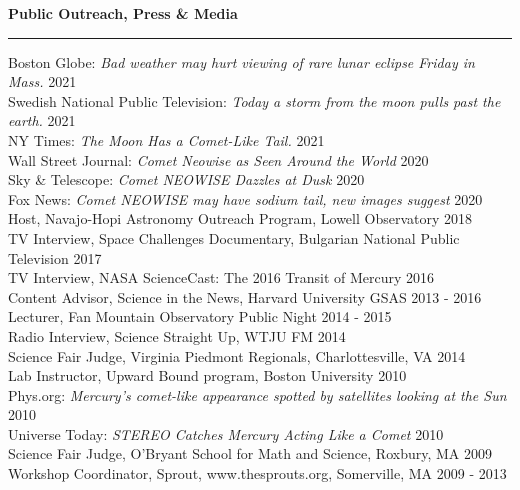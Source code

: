 \documentclass[12pt]{report}
\begin{document}
\noindent\bf{Public Outreach, Press \& Media}\rm \hspace*{\fill} \\
\rule{\textwidth}{1pt}
\noindent Boston Globe: {\it Bad weather may hurt viewing of rare lunar eclipse Friday in Mass.} \hfill 2021\\
\noindent Swedish National Public Television: {\it Today a storm from the moon pulls past the earth.} \hfill 2021\\
\noindent NY Times: {\it The Moon Has a Comet-Like Tail.} \hfill 2021\\
\noindent Wall Street Journal: {\it Comet Neowise as Seen Around the World} \hfill 2020\\
\noindent Sky \& Telescope: {\it Comet NEOWISE Dazzles at Dusk} \hfill 2020\\
\noindent Fox News: {\it Comet NEOWISE may have sodium tail, new images suggest} \hfill 2020\\
\noindent Host, Navajo-Hopi Astronomy Outreach Program, Lowell Observatory \hfill 2018\\
\noindent TV Interview, Space Challenges Documentary, Bulgarian National Public Television \hfill 2017\\
\noindent TV Interview, NASA ScienceCast: The 2016 Transit of Mercury \hfill 2016\\
\noindent Content Advisor, Science in the News, Harvard University GSAS \hfill 2013 - 2016\\
\noindent Lecturer, Fan Mountain Observatory Public Night \hfill 2014 - 2015\\
\noindent Radio Interview, Science Straight Up, WTJU FM \hfill 2014\\
\noindent Science Fair Judge, Virginia Piedmont Regionals, Charlottesville, VA \hfill 2014\\
\noindent Lab Instructor, Upward Bound program, Boston University \hfill 2010\\
\noindent Phys.org: {\it Mercury's comet-like appearance spotted by satellites looking at the Sun} \hfill 2010\\
\noindent Universe Today: {\it STEREO Catches Mercury Acting Like a Comet} \hfill 2010\\
\noindent Science Fair Judge, O'Bryant School for Math and Science, Roxbury, MA \hfill 2009\\
\noindent Workshop Coordinator, Sprout, www.thesprouts.org, Somerville, MA \hfill 2009 - 2013\\
\end{document}
